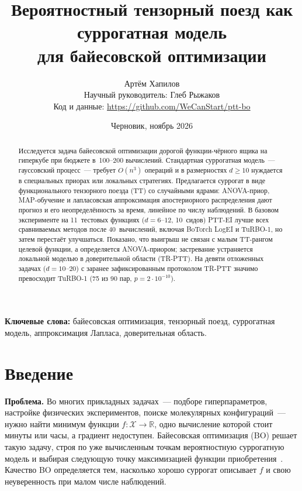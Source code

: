 \documentclass[11pt,a4paper]{article}
\title{Вероятностный тензорный поезд как суррогатная модель\\ для байесовской оптимизации}
\author{Артём Хапилов\\[2pt]
\small Научный руководитель: Глеб Рыжаков\\
\small Код и данные: \url{https://github.com/WeCanStart/ptt-bo}}
\date{Черновик, ноябрь 2026}
\newcommand{\X}{\mathcal X}
\newcommand{\R}{\mathbb R}
\begin{document}
\maketitle

\begin{abstract}
Исследуется задача байесовской оптимизации дорогой функции-чёрного ящика на гиперкубе при бюджете
в~100--200 вычислений. Стандартная суррогатная модель~--- гауссовский процесс~--- требует $O(n^3)$ операций
и в размерностях $d\ge 10$ нуждается в специальных приорах или локальных стратегиях. Предлагается
суррогат в виде функционального тензорного поезда (TT) со случайными ядрами: ANOVA-приор, MAP-обучение
и лапласовская аппроксимация апостериорного распределения дают прогноз и его неопределённость за время,
линейное по числу наблюдений. В базовом эксперименте на 11~тестовых функциях ($d=6$--$12$, 10~сидов)
PTT-EI лучше всех сравниваемых методов после 40~вычислений, включая BoTorch LogEI и TuRBO-1, но затем
перестаёт улучшаться. Показано, что выигрыш не связан с малым TT-рангом целевой функции, а определяется
ANOVA-приором; застревание устраняется локальной моделью в доверительной области (TR-PTT). На девяти
отложенных задачах ($d=10$--$20$) с заранее зафиксированным протоколом TR-PTT значимо превосходит TuRBO-1
(75 из 90 пар, $p=2\cdot10^{-10}$).
\end{abstract}

\noindent\textbf{Ключевые слова:} байесовская оптимизация, тензорный поезд, суррогатная модель,
аппроксимация Лапласа, доверительная область.

\section{Введение}

\textbf{Проблема.} Во многих прикладных задачах~--- подборе гиперпараметров, настройке физических
экспериментов, поиске молекулярных конфигураций~--- нужно найти минимум функции $f:\X\to\R$, одно
вычисление которой стоит минуты или часы, а градиент недоступен. Байесовская оптимизация (BO) решает такую
задачу, строя по уже вычисленным точкам вероятностную суррогатную модель и выбирая следующую точку
максимизацией функции приобретения~\cite{jones1998ego,snoek2012practical,frazier2018tutorial,garnett2023bo}.
Качество BO определяется тем, насколько хорошо суррогат описывает $f$ и свою неуверенность при малом
числе наблюдений.
\end{document}
